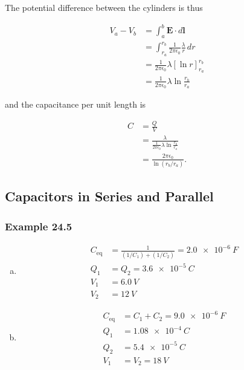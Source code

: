 \documentclass{article}
\begin{document}
The potential difference between the cylinders is thus

\begin{align*}
  V_a - V_b & = \int_a^b \mathbf{E} \cdot d\mathbf{l}                               \\
            & = \int_{r_a}^{r_b} \frac{1}{2 \pi \epsilon_0} \frac{\lambda}{r} \,dr  \\
            & = \frac{1}{2 \pi \epsilon_0} \lambda \left[ \ln r \right]_{r_a}^{r_b} \\
            & = \frac{1}{2 \pi \epsilon_0} \lambda \ln \frac{r_b}{r_a}
\end{align*}

and the capacitance per unit length is

\begin{align*}
  C & = \frac{Q}{V}                                                            \\
    & = \frac{\lambda}{\frac{1}{2 \pi \epsilon_0} \lambda \ln \frac{r_b}{r_a}} \\
    & = \frac{2 \pi \epsilon_0}{\ln (r_b / r_a)}.
\end{align*}

\subsection{Capacitors in Series and Parallel}

\subsubsection{Example 24.5}

\begin{enumerate}[(a)]
  \item

        \begin{align*}
          C_\textrm{eq} & = \frac{1}{(1/C_1) + (1/C_2)} = \qty{2.0e-6}{F} \\
          Q_1           & = Q_2 = \qty{3.6e-5}{C}                         \\
          V_1           & = \qty{6.0}{V}                                  \\
          V_2           & = \qty{12}{V}
        \end{align*}

  \item

        \begin{align*}
          C_\textrm{eq} & = C_1 + C_2 = \qty{9.0e-6}{F} \\
          Q_1           & = \qty{1.08e-4}{C}            \\
          Q_2           & = \qty{5.4e-5}{C}             \\
          V_1           & = V_2 = \qty{18}{V}
        \end{align*}
\end{enumerate}
\end{document}
